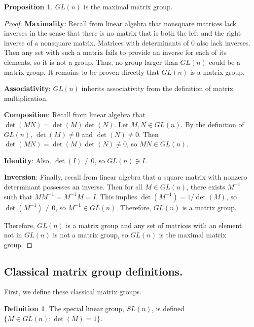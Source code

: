 \documentclass[12pt]{article}
\theoremstyle{definition}
\newtheorem{prop}[them]{Proposition}
\theoremstyle{definition}
\theoremstyle{definition}
\theoremstyle{definition}
\theoremstyle{definition}
\newtheorem{defn}[them]{Definition}
\theoremstyle{definition}
\theoremstyle{definition}
\theoremstyle{definition}
\begin{document}
\begin{prop}
$GL(n)$ is the maximal matrix group.
\end{prop}
\begin{proof}
\par{\textbf{Maximality}: Recall from linear
algebra that nonsquare matrices lack inverses in
the sense that there is no matrix that is both the
left and the right inverse of a nonsquare matrix.
Matrices with determinants of $0$ also lack
inverses. Then any set with such a matrix fails to
provide an inverse for each of its
elements, so it is not a group. Thus, no group
larger than $GL(n)$ could be a matrix group. It
remains to be proven directly that $GL(n)$ is a
matrix group.}

\par{\textbf{Associativity}: $GL(n)$ inherits associativity from the
definition of matrix multiplication.}

\par{\textbf{Composition}: Recall from linear algebra that $\det(MN) =
\det(M)\det(N)$. Let $M, N \in GL(n)$. By the
definition of $GL(n)$, $\det(M) \neq 0$ and
$\det(N) \neq 0$. Then $\det(MN) = \det(M)\det(N)
\neq 0$, so $MN \in GL(n)$.} 

\par{\textbf{Identity}: Also, $\det(I) \neq 0$, so
$GL(n) \ni I$.} 

\par{\textbf{Inversion}: Finally, recall from
linear algebra that a square matrix with nonzero
determinant possesses an inverse. Then for all $M
\in GL(n)$, there exists $M^{-1}$ such that
$MM^{-1} = M^{-1}M = I$. This implies
$\det(M^{-1}) = 1/ \det(M)$, so $\det(M^{-1}) \neq
0$, so $M^{-1} \in GL(n)$. Therefore, $GL(n)$ is a
matrix group.}

\par{Therefore, $GL(n)$ is a matrix group and any set
of matrices with an element not in $GL(n)$ is not
a matrix group, so $GL(n)$ is the maximal matrix
group.}
\end{proof}

\subsection{Classical matrix group definitions.}

\par{First, we define these classical matrix groups.}

\begin{defn} 
The special linear group, $SL(n)$, is defined $\{M
\in GL(n): \det(M) = 1\}$.
\end{defn}
\end{document}
